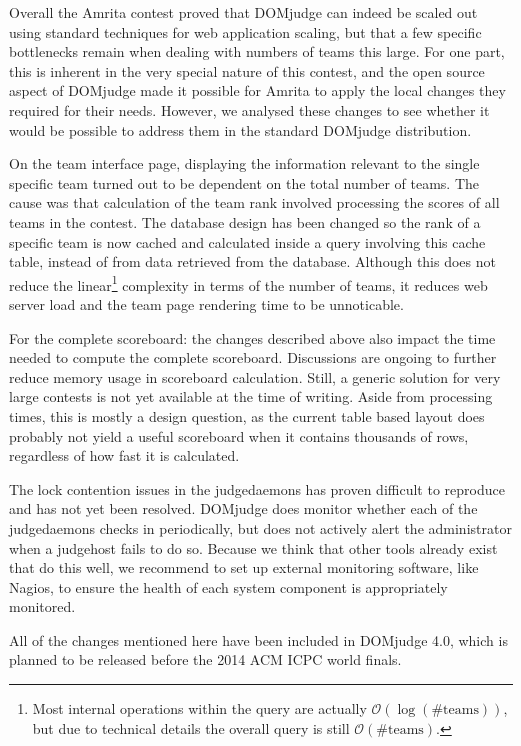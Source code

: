 \documentclass[DIV=calc, paper=a4, fontsize=11pt, twocolumn]{scrartcl}	 %
\begin{document}
Overall the Amrita contest proved that DOMjudge can indeed be scaled out using
standard techniques for web application scaling, but that a few specific
bottlenecks remain when dealing with numbers of teams this large.
For one part, this is inherent in the very special nature of this contest,
and the open source aspect of DOMjudge made it possible for Amrita to
apply the local changes they required for their needs. However, we analysed
these changes to see whether it would be possible to address them in the
standard DOMjudge distribution.

On the team interface page, displaying the information relevant to the single
specific team turned out to be dependent on the total number of teams.
The cause was that calculation of the team rank involved processing
the scores of all teams in the contest. The database design has been
changed so the rank of a specific team is now cached and calculated
inside a query involving this cache table, instead of from data retrieved
from the database. Although this does not reduce the linear\footnote{%
  Most internal operations within the query are actually
  $\mathcal{O}(\log(\#\textrm{teams}))$, but due to technical details the
  overall query is still $\mathcal{O}(\#\textrm{teams})$.%
} complexity in terms of the number of teams, it reduces web server
load and the team page rendering time to be unnoticable.

For the complete scoreboard: the changes described above also impact the
time needed to compute the complete scoreboard. Discussions are ongoing
to further reduce memory usage in scoreboard calculation.
Still, a generic solution for very large contests is not yet available
at the time of writing. Aside from processing times, this is mostly a
design question, as the current table based layout does probably not
yield a useful scoreboard when it contains thousands of rows, regardless
of how fast it is calculated.

The lock contention issues in the judgedaemons has proven difficult to
reproduce and has not yet been resolved.
DOMjudge does monitor whether each of the judgedaemons checks in periodically,
but does not actively alert the administrator when a judgehost fails to do
so. Because we think that other tools already exist that do this well, we
recommend to set up external monitoring software, like Nagios, to ensure
the health of each system component is appropriately monitored.

All of the changes mentioned here have been included in DOMjudge 4.0,
which is planned to be released before the 2014 ACM ICPC world finals.


\end{document}
